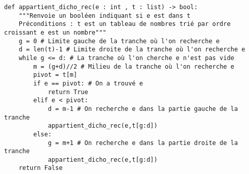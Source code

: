 \begin{lstlisting}
def appartient_dicho_rec(e : int , t : list) -> bool:
    """Renvoie un booléen indiquant si e est dans t
    Préconditions : t est un tableau de nombres trié par ordre croissant e est un nombre"""
    g = 0 # Limite gauche de la tranche où l'on recherche e
    d = len(t)-1 # Limite droite de la tranche où l'on recherche e
    while g <= d: # La tranche où l'on cherche e n'est pas vide
        m = (g+d)//2 # Milieu de la tranche où l'on recherche e
        pivot = t[m]
        if e == pivot: # On a trouvé e
            return True
        elif e < pivot:
            d = m-1 # On recherche e dans la partie gauche de la tranche
            appartient_dicho_rec(e,t[g:d])
        else:
            g = m+1 # On recherche e dans la partie droite de la tranche
            appartient_dicho_rec(e,t[g:d])
    return False
\end{lstlisting}

